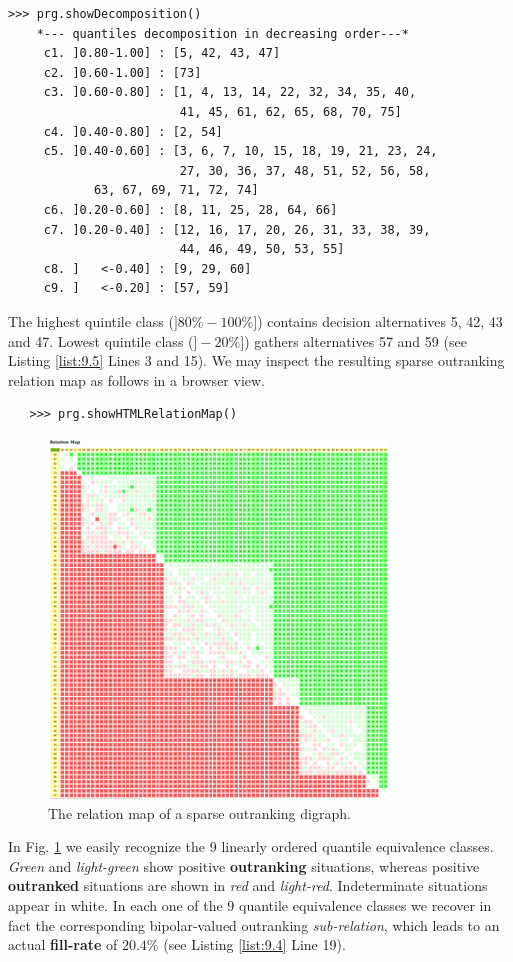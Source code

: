\begin{lstlisting}[caption={The quantiles decomposition of a pre-ranked outranking digraph},label=list:9.5]
>>> prg.showDecomposition()
    *--- quantiles decomposition in decreasing order---*
     c1. ]0.80-1.00] : [5, 42, 43, 47]
     c2. ]0.60-1.00] : [73]
     c3. ]0.60-0.80] : [1, 4, 13, 14, 22, 32, 34, 35, 40,
                        41, 45, 61, 62, 65, 68, 70, 75]
     c4. ]0.40-0.80] : [2, 54]
     c5. ]0.40-0.60] : [3, 6, 7, 10, 15, 18, 19, 21, 23, 24,
                        27, 30, 36, 37, 48, 51, 52, 56, 58,
			63, 67, 69, 71, 72, 74]
     c6. ]0.20-0.60] : [8, 11, 25, 28, 64, 66]
     c7. ]0.20-0.40] : [12, 16, 17, 20, 26, 31, 33, 38, 39,
                        44, 46, 49, 50, 53, 55]
     c8. ]   <-0.40] : [9, 29, 60]
     c9. ]   <-0.20] : [57, 59]
\end{lstlisting}

The highest quintile class ($]80\%-100\%]$) contains decision alternatives 5, 42, 43 and 47. Lowest quintile class ($]-20\%]$) gathers alternatives 57 and 59 (see Listing \ref{list:9.5} Lines 3 and 15). We may inspect the resulting sparse outranking relation map as follows in a browser view.

\begin{lstlisting}
   >>> prg.showHTMLRelationMap()
\end{lstlisting}

\begin{figure}[h]
\includegraphics[width=9cm]{Figures/sparse75RelationMap.png}
\caption{The relation map of a sparse outranking digraph.}
\label{fig:9.1}       %
\end{figure}
\clearpage
In Fig. \ref{fig:9.1} we easily recognize the 9 linearly ordered quantile equivalence classes. \emph{Green} and \emph{light-green} show positive \textbf{outranking} situations, whereas positive \textbf{outranked} situations are shown in \emph{red} and \emph{light-red}. Indeterminate situations appear in white. In each one of the 9 quantile equivalence classes we recover in fact the corresponding bipolar-valued outranking \emph{sub-relation}, which leads to an actual \textbf{fill-rate} of $20.4\%$ (see Listing \ref{list:9.4} Line 19).

